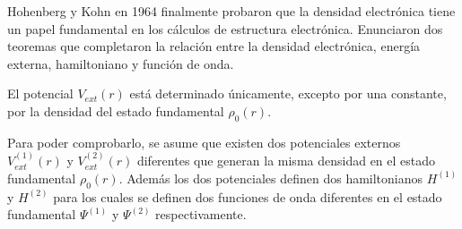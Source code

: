 Hohenberg y Kohn  en 1964 finalmente probaron que la densidad electr\'onica 
tiene un papel fundamental en los c\'alculos de estructura electr\'onica. 
Enunciaron dos teoremas que completaron la relaci\'on entre la densidad 
electr\'onica, energ\'ia externa, hamiltoniano y funci\'on de onda.


\begin{hk}
    El potencial $V_{ext}(r)$ est\'a determinado \'unicamente, excepto por una 
    constante, por la densidad del estado fundamental $\rho _{0}(r)$.
\end{hk}

\noindent Para poder comprobarlo, se asume que existen dos potenciales externos 
$V_{ext}^{(1)}(r)$ y $V_{ext}^{(2)}(r)$ diferentes que generan la misma 
densidad en el estado fundamental $\rho _{0}(r)$. 
Adem\'as los dos potenciales definen dos hamiltonianos $H^{(1)}$ y $H^{(2)}$ 
para los cuales se definen dos funciones de onda diferentes en el estado 
fundamental $\Psi ^{(1)}$ y $\Psi ^{(2)}$ respectivamente.

